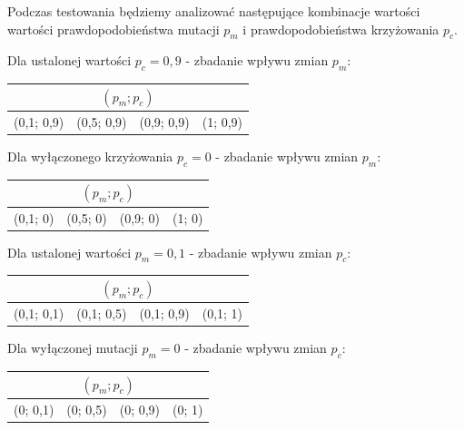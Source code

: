 \documentclass[12pt, a4paper]{article}
\begin{document}
Podczas testowania będziemy analizować następujące kombinacje wartości wartości prawdopodobieństwa mutacji $p_m$ i prawdopodobieństwa krzyżowania $p_c$.

\bigskip

Dla ustalonej wartości $p_c = 0,9$ - zbadanie wpływu zmian $p_m$:
\begin{center}
\begin{tabular}{|l|l|l|l|}
\hline
\multicolumn{4}{|c|}{$(p_m; p_c)$} \\
\hline
(0,1; 0,9) & (0,5; 0,9) & (0,9; 0,9) & (1; 0,9)\\
\hline
\end{tabular}
\end{center}

\bigskip

Dla wyłączonego krzyżowania $p_c = 0$ - zbadanie wpływu zmian $p_m$:
\begin{center}
\begin{tabular}{|l|l|l|l|}
\hline
\multicolumn{4}{|c|}{$(p_m; p_c)$} \\
\hline
(0,1; 0) & (0,5; 0) & (0,9; 0) & (1; 0)\\
\hline
\end{tabular}
\end{center}

\bigskip

Dla ustalonej wartości $p_m = 0,1$ - zbadanie wpływu zmian $p_c$:
\begin{center}
\begin{tabular}{|l|l|l|l|}
\hline
\multicolumn{4}{|c|}{$(p_m; p_c)$} \\
\hline
(0,1; 0,1) & (0,1; 0,5) & (0,1; 0,9) & (0,1; 1)\\
\hline
\end{tabular}
\end{center}

\bigskip

Dla wyłączonej mutacji $p_m = 0$ - zbadanie wpływu zmian $p_c$:
\begin{center}
\begin{tabular}{|l|l|l|l|}
\hline
\multicolumn{4}{|c|}{$(p_m; p_c)$} \\
\hline
(0; 0,1) & (0; 0,5) & (0; 0,9) & (0; 1)\\
\hline
\end{tabular}
\end{center}

\bigskip
\end{document}
